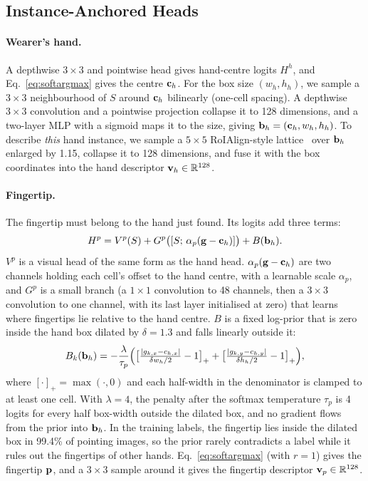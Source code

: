 \subsection{Instance-Anchored Heads}\label{sec:heads}

\paragraph{Wearer's hand.} A depthwise $3\times3$ and pointwise head gives hand-centre logits $H^h$, and Eq.~\eqref{eq:softargmax} gives the centre $\mathbf{c}_h$. For the box size $(w_h,h_h)$, we sample a $3\times3$ neighbourhood of $S$ around $\mathbf{c}_h$ bilinearly (one-cell spacing). A depthwise $3\times3$ convolution and a pointwise projection collapse it to 128 dimensions, and a two-layer MLP with a sigmoid maps it to the size, giving $\mathbf{b}_h=(\mathbf{c}_h,w_h,h_h)$. To describe \emph{this} hand instance, we sample a $5\times5$ RoIAlign-style lattice~\cite{he2017mask} over $\mathbf{b}_h$ enlarged by 1.15, collapse it to 128 dimensions, and fuse it with the box coordinates into the hand descriptor $\mathbf{v}_h\in\mathbb{R}^{128}$.

\paragraph{Fingertip.} The fingertip must belong to the hand just found. Its logits add three terms:
\begin{equation}
H^p = V^p(S) + G^p\big([S;\,\alpha_p(\mathbf{g}-\mathbf{c}_h)]\big) + B(\mathbf{b}_h).
\label{eq:tip}
\end{equation}
$V^p$ is a visual head of the same form as the hand head. $\alpha_p(\mathbf{g}-\mathbf{c}_h)$ are two channels holding each cell's offset to the hand centre, with a learnable scale $\alpha_p$, and $G^p$ is a small branch (a $1\times1$ convolution to 48 channels, then a $3\times3$ convolution to one channel, with its last layer initialised at zero) that learns where fingertips lie relative to the hand centre. $B$ is a fixed log-prior that is zero inside the hand box dilated by $\delta{=}1.3$ and falls linearly outside it:
\begin{equation}
B_k(\mathbf{b}_h) = -\frac{\lambda}{\tau_p}\Big(\big[\tfrac{|g_{k,x}-c_{h,x}|}{\delta w_h/2}-1\big]_+ + \big[\tfrac{|g_{k,y}-c_{h,y}|}{\delta h_h/2}-1\big]_+\Big),
\label{eq:boxprior}
\end{equation}
where $[\cdot]_+=\max(\cdot,0)$ and each half-width in the denominator is clamped to at least one cell. With $\lambda{=}4$, the penalty after the softmax temperature $\tau_p$ is 4 logits for every half box-width outside the dilated box, and no gradient flows from the prior into $\mathbf{b}_h$. In the training labels, the fingertip lies inside the dilated box in 99.4\% of pointing images, so the prior rarely contradicts a label while it rules out the fingertips of other hands. Eq.~\eqref{eq:softargmax} (with $r{=}1$) gives the fingertip $\mathbf{p}$, and a $3\times3$ sample around it gives the fingertip descriptor $\mathbf{v}_p\in\mathbb{R}^{128}$.

